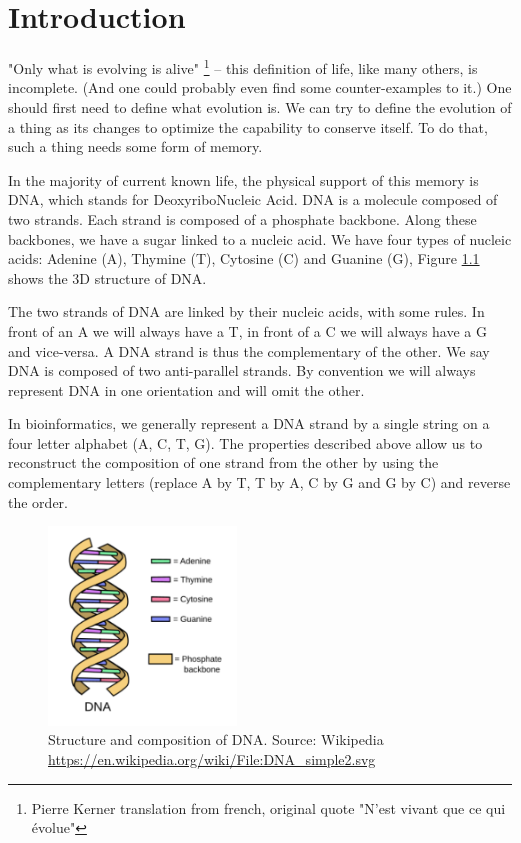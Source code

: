 \documentclass[./main.tex]{subfiles}
\begin{document}
\chapter{Introduction}\label{chapter:introduction}

"Only what is evolving is alive" \footnote{Pierre Kerner translation from french, original quote "N'est vivant que ce qui évolue"} -- this definition of life, like many others, is incomplete. (And one could probably even find some counter-examples to it.) One should first need to define what evolution is. We can try to define the evolution of a thing as its changes to optimize the capability to conserve itself. To do that, such a thing needs some form of memory.

In the majority of current known life, the physical support of this memory is DNA, which stands for DeoxyriboNucleic Acid. DNA is a molecule composed of two strands. Each strand is composed of a phosphate backbone. Along these backbones, we have a sugar linked to a nucleic acid. We have four types of nucleic acids: Adenine (A), Thymine (T), Cytosine (C) and Guanine (G), Figure \ref{intro:fig:dna_rna_pres} shows the 3D structure of DNA.

The two strands of DNA are linked by their nucleic acids, with some rules. In front of an A we will always have a T, in front of a C we will always have a G and vice-versa. A DNA strand is thus the complementary of the other. %
We say DNA is composed of two anti-parallel strands. By convention we will always represent DNA in one orientation and will omit the other.

In bioinformatics, we generally represent a DNA strand by a single string on a four letter alphabet (A, C, T, G). The properties described above allow us to reconstruct the composition of one strand from the other by using the complementary letters (replace A by T, T by A, C by G and G by C) and reverse the order.%

\begin{figure}[ht]
    \centering
    \includegraphics[width=5cm]{introduction/images/DNA.pdf}
    \caption{Structure and composition of DNA. Source: Wikipedia \protect\url{https://en.wikipedia.org/wiki/File:DNA_simple2.svg}}
    \label{intro:fig:dna_rna_pres}
\end{figure}
\end{document}
